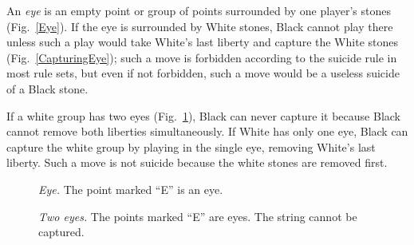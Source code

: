 An \emph{eye} is an empty point or group of points surrounded by one player's stones (Fig.~\ref{Eye}). If the eye is surrounded by White stones, Black cannot play there unless such a play would take White's last liberty and capture the White stones (Fig.~\ref{CapturingEye}); such a move is forbidden according to the suicide rule in most rule sets, but even if not forbidden, such a move would be a useless suicide of a Black stone.

If a white group has two eyes (Fig.~\ref{DoubleEye}), Black can never capture it because Black cannot remove both liberties simultaneously. If White has only one eye, Black can capture the white group by playing in the single eye, removing White's last liberty. Such a move is not suicide because the white stones are removed first.
\begin{figure}[h!t]
\centering
\begin{minipage}{0.375\textwidth}
	\centering
	\caption{\emph{Eye.} The point marked ``E'' is an eye.}\label{Eye}
\end{minipage}%
\hfill
\begin{minipage}{0.55\textwidth}
	\centering
	\caption{\emph{Two eyes.} The points marked ``E'' are eyes. The string cannot be captured.}\label{DoubleEye}
\end{minipage}
\end{figure}

